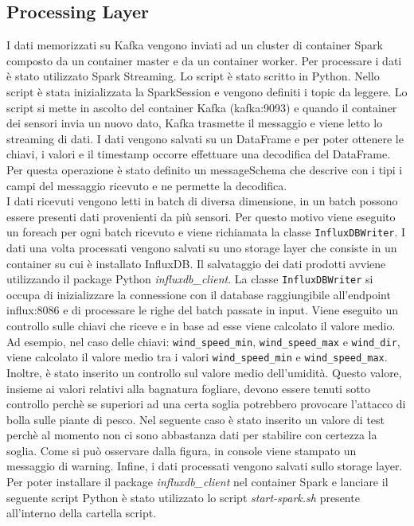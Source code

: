 \documentclass{article}
\begin{document}
\subsection{Processing Layer}
I dati memorizzati su Kafka vengono inviati ad un cluster di container Spark composto da un container master e da un container worker. Per processare i dati è stato utilizzato Spark Streaming. Lo script è stato scritto in Python. Nello script è stata inizializzata la SparkSession e vengono definiti i topic da leggere. Lo script si mette in ascolto del container Kafka (kafka:9093) e quando il container dei sensori invia un nuovo dato, Kafka trasmette il messaggio e viene letto lo streaming di dati. I dati vengono salvati su un DataFrame e per poter ottenere le chiavi, i valori e il timestamp occorre effettuare una decodifica del DataFrame. Per questa operazione è stato definito un messageSchema che descrive con i tipi i campi del messaggio ricevuto e ne permette la decodifica.\\
I dati ricevuti vengono letti in batch di diversa dimensione, in un batch possono essere presenti dati provenienti da più sensori. Per questo motivo viene eseguito un foreach per ogni batch ricevuto e viene richiamata la classe \texttt{InfluxDBWriter}. I dati una volta processati vengono salvati su uno storage layer che consiste in un container su cui è installato InfluxDB. Il salvataggio dei dati prodotti avviene utilizzando il package Python \textit{influxdb\_client}. La classe \texttt{InfluxDBWriter} si occupa di inizializzare la connessione con il database raggiungibile all'endpoint influx:8086 e di processare le righe del batch passate in input. Viene eseguito un controllo sulle chiavi che riceve e in base ad esse viene calcolato il valore medio. Ad esempio, nel caso delle chiavi: \texttt{wind\_speed\_min}, \texttt{wind\_speed\_max} e \texttt{wind\_dir}, viene calcolato il valore medio tra i valori \texttt{wind\_speed\_min} e \texttt{wind\_speed\_max}.\\
Inoltre, è stato inserito un controllo sul valore medio dell'umidità. Questo valore, insieme ai valori relativi alla bagnatura fogliare, devono essere tenuti sotto controllo perchè se superiori ad una certa soglia potrebbero provocare l'attacco di bolla sulle piante di pesco. Nel seguente caso è stato inserito un valore di test perchè al momento non ci sono abbastanza dati per stabilire con certezza la soglia.
Come si può osservare dalla figura, in console viene stampato un messaggio di warning.
Infine, i dati processati vengono salvati sullo storage layer.\\
Per poter installare il package \textit{influxdb\_client} nel container Spark e lanciare il seguente script Python è stato utilizzato lo script \textit{start-spark.sh} presente all'interno della cartella script.
\end{document}
